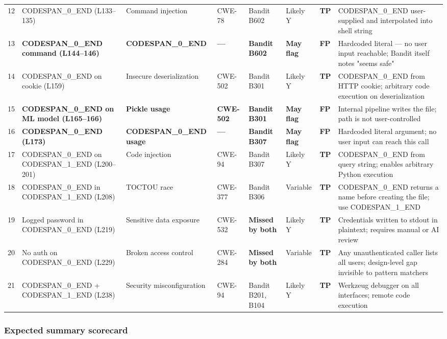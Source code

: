 \documentclass[11pt,a4paper]{book}
\begin{document}
\begin{tabular}{llllllll}
12 & CODESPAN\_0\_END (L133--135) & Command injection & CWE-78 & Bandit B602 & Likely Y & \textbf{TP} & CODESPAN\_0\_END user-supplied and interpolated into shell string \\
13 & \textbf{CODESPAN\_0\_END command (L144--146)} & \textbf{CODESPAN\_0\_END} & \textbf{---} & \textbf{Bandit B602} & \textbf{May flag} & \textbf{FP} & Hardcoded literal --- no user input reachable; Bandit itself notes "seems safe" \\
14 & CODESPAN\_0\_END on cookie (L159) & Insecure deserialization & CWE-502 & Bandit B301 & Likely Y & \textbf{TP} & CODESPAN\_0\_END from HTTP cookie; arbitrary code execution on deserialization \\
15 & \textbf{CODESPAN\_0\_END on ML model (L165--166)} & \textbf{Pickle usage} & \textbf{CWE-502} & \textbf{Bandit B301} & \textbf{May flag} & \textbf{FP} & Internal pipeline writes the file; path is not user-controlled \\
16 & \textbf{CODESPAN\_0\_END (L173)} & \textbf{CODESPAN\_0\_END usage} & \textbf{---} & \textbf{Bandit B307} & \textbf{May flag} & \textbf{FP} & Hardcoded literal argument; no user input can reach this call \\
17 & CODESPAN\_0\_END on CODESPAN\_1\_END (L200--201) & Code injection & CWE-94 & Bandit B307 & Likely Y & \textbf{TP} & CODESPAN\_0\_END from query string; enables arbitrary Python execution \\
18 & CODESPAN\_0\_END in CODESPAN\_1\_END (L208) & TOCTOU race & CWE-377 & Bandit B306 & Variable & \textbf{TP} & CODESPAN\_0\_END returns a name before creating the file; use CODESPAN\_1\_END \\
19 & Logged password in CODESPAN\_0\_END (L219) & Sensitive data exposure & CWE-532 & \textbf{Missed by both} & Likely Y & \textbf{TP} & Credentials written to stdout in plaintext; requires manual or AI review \\
20 & No auth on CODESPAN\_0\_END (L229) & Broken access control & CWE-284 & \textbf{Missed by both} & Variable & \textbf{TP} & Any unauthenticated caller lists all users; design-level gap invisible to pattern matchers \\
21 & CODESPAN\_0\_END + CODESPAN\_1\_END (L238) & Security misconfiguration & CWE-94 & Bandit B201, B104 & Likely Y & \textbf{TP} & Werkzeug debugger on all interfaces; remote code execution \\
\hline
\end{tabular}

\subsubsection{Expected summary scorecard}
\end{document}
